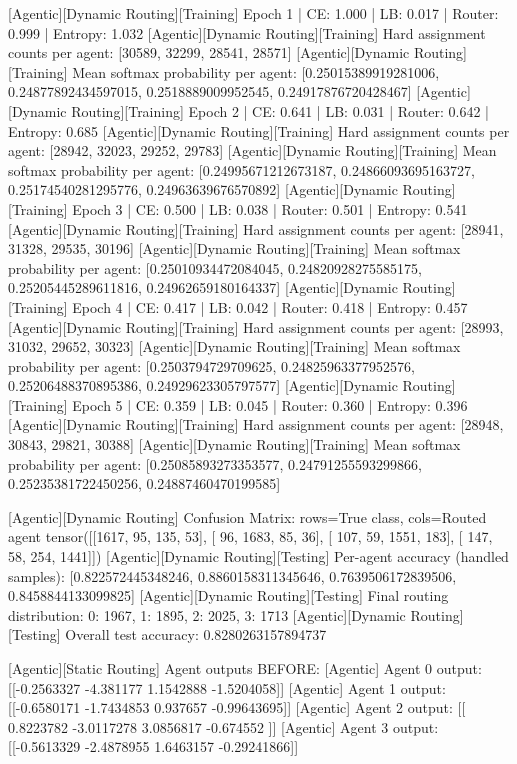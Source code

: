 [Agentic][Dynamic Routing][Training] Epoch 1 | CE: 1.000 | LB: 0.017 | Router: 0.999 | Entropy: 1.032
[Agentic][Dynamic Routing][Training] Hard assignment counts per agent: [30589, 32299, 28541, 28571]
[Agentic][Dynamic Routing][Training] Mean softmax probability per agent: [0.25015389919281006, 0.24877892434597015, 0.2518889009952545, 0.24917876720428467]
[Agentic][Dynamic Routing][Training] Epoch 2 | CE: 0.641 | LB: 0.031 | Router: 0.642 | Entropy: 0.685
[Agentic][Dynamic Routing][Training] Hard assignment counts per agent: [28942, 32023, 29252, 29783]
[Agentic][Dynamic Routing][Training] Mean softmax probability per agent: [0.24995671212673187, 0.24866093695163727, 0.25174540281295776, 0.24963639676570892]
[Agentic][Dynamic Routing][Training] Epoch 3 | CE: 0.500 | LB: 0.038 | Router: 0.501 | Entropy: 0.541
[Agentic][Dynamic Routing][Training] Hard assignment counts per agent: [28941, 31328, 29535, 30196]
[Agentic][Dynamic Routing][Training] Mean softmax probability per agent: [0.25010934472084045, 0.24820928275585175, 0.25205445289611816, 0.24962659180164337]
[Agentic][Dynamic Routing][Training] Epoch 4 | CE: 0.417 | LB: 0.042 | Router: 0.418 | Entropy: 0.457
[Agentic][Dynamic Routing][Training] Hard assignment counts per agent: [28993, 31032, 29652, 30323]
[Agentic][Dynamic Routing][Training] Mean softmax probability per agent: [0.2503794729709625, 0.24825963377952576, 0.25206488370895386, 0.24929623305797577]
[Agentic][Dynamic Routing][Training] Epoch 5 | CE: 0.359 | LB: 0.045 | Router: 0.360 | Entropy: 0.396
[Agentic][Dynamic Routing][Training] Hard assignment counts per agent: [28948, 30843, 29821, 30388]
[Agentic][Dynamic Routing][Training] Mean softmax probability per agent: [0.25085893273353577, 0.24791255593299866, 0.25235381722450256, 0.24887460470199585]

[Agentic][Dynamic Routing] Confusion Matrix: rows=True class, cols=Routed agent
tensor([[1617,   95,  135,   53],
[  96, 1683,   85,   36],
[ 107,   59, 1551,  183],
[ 147,   58,  254, 1441]])
[Agentic][Dynamic Routing][Testing] Per-agent accuracy (handled samples): [0.822572445348246, 0.8860158311345646, 0.7639506172839506, 0.8458844133099825]
[Agentic][Dynamic Routing][Testing] Final routing distribution: {0: 1967, 1: 1895, 2: 2025, 3: 1713}
[Agentic][Dynamic Routing][Testing] Overall test accuracy: 0.8280263157894737

[Agentic][Static Routing] Agent outputs BEFORE:
[Agentic] Agent 0 output: [[-0.2563327 -4.381177   1.1542888 -1.5204058]]
[Agentic] Agent 1 output: [[-0.6580171  -1.7434853   0.937657   -0.99643695]]
[Agentic] Agent 2 output: [[ 0.8223782 -3.0117278  3.0856817 -0.674552 ]]
[Agentic] Agent 3 output: [[-0.5613329  -2.4878955   1.6463157  -0.29241866]]

